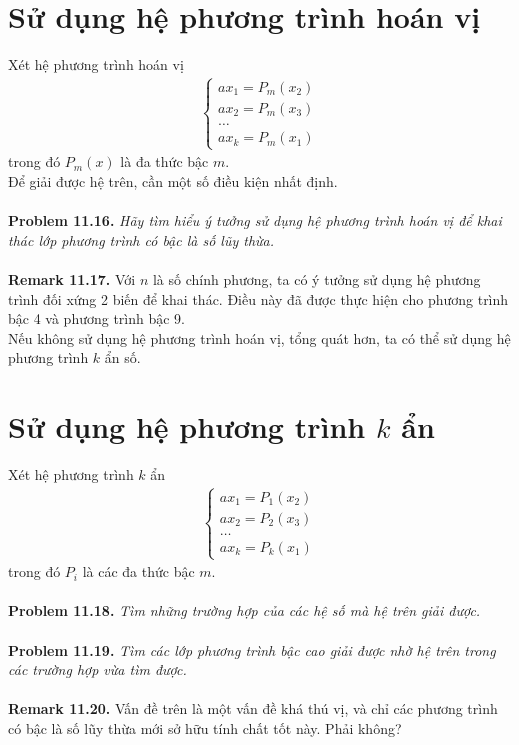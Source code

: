 \documentclass[a4paper,oneside]{book}
\numberwithin{equation}{chapter}
\begin{document}
\section{Sử dụng hệ phương trình hoán vị} 
Xét hệ phương trình hoán vị
\begin{align}
\left\{ {\begin{array}{*{20}{c}}
{a{x_1} = {P_m}\left( {{x_2}} \right)}\\
{a{x_2} = {P_m}\left( {{x_3}} \right)}\\
{\ldots}\\
{a{x_k} = {P_m}\left( {{x_1}} \right)}
\end{array}} \right.
\end{align}
trong đó ${P_m}\left( x \right)$ là đa thức bậc $m$.\\

Để giải được hệ trên, cần một số điều kiện nhất định.\\
\\
\textbf{Problem 11.16.} \textit{Hãy tìm hiểu ý tưởng sử dụng hệ phương trình hoán vị để khai thác lớp phương trình có bậc là số lũy thừa.}\\
\\
\textbf{Remark 11.17.} Với $n$ là số chính phương, ta có ý tưởng sử dụng hệ phương trình đối xứng 2 biến để khai thác. Điều này đã được thực hiện cho phương trình bậc 4 và phương trình bậc 9.\\

Nếu không sử dụng hệ phương trình hoán vị, tổng quát hơn, ta có thể sử dụng hệ phương trình $k$ ẩn số.
\section{Sử dụng hệ phương trình $k$ ẩn}
Xét hệ phương trình $k$ ẩn 
\begin{align}
\left\{ {\begin{array}{*{20}{c}}
{a{x_1} = {P_1}\left( {{x_2}} \right)}\\
{a{x_2} = {P_2}\left( {{x_3}} \right)}\\
{\ldots}\\
{a{x_k} = {P_k}\left( {{x_1}} \right)}
\end{array}} \right.
\end{align}
trong đó ${P_i}$ là các đa thức bậc $m$.\\
\\
\textbf{Problem 11.18.} \textit{Tìm những trường hợp của các hệ số mà hệ trên giải được.}\\
\\
\textbf{Problem 11.19.} \textit{Tìm các lớp phương trình bậc cao giải được nhờ hệ trên trong các trường hợp vừa tìm được.}\\
\\
\textbf{Remark 11.20.} Vấn đề trên là một vấn đề khá thú vị, và chỉ các phương trình có bậc là số lũy thừa mới sở hữu tính chất tốt này. Phải không?
\end{document}
